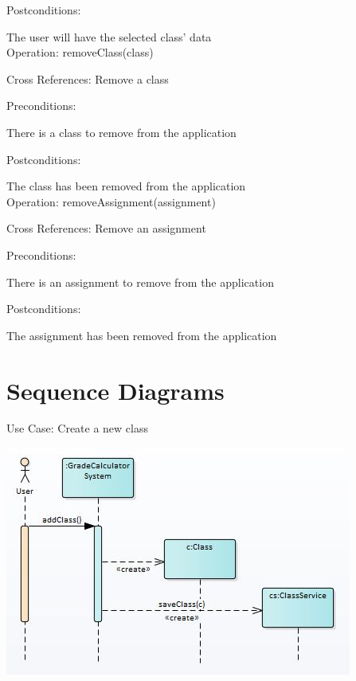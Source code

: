 \documentclass[12pt]{article}
\begin{document}
\noindent
Postconditions:

The user will have the selected class' data \\

\noindent
Operation: removeClass(class)

\noindent
Cross References: Remove a class

\noindent
Preconditions:

There is a class to remove from the application

\noindent
Postconditions:

The class has been removed from the application \\

\noindent
Operation: removeAssignment(assignment)

\noindent
Cross References: Remove an assignment

\noindent
Preconditions:

There is an assignment to remove from the application

\noindent
Postconditions:

The assignment has been removed from the application \\

\newpage

\section*{Sequence Diagrams}

\noindent
Use Case: Create a new class

\noindent
\includegraphics[width=\textwidth]{SequenceDiagram1} \\

\newpage
\end{document}
